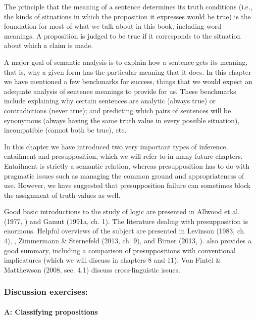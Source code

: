 The principle that the meaning of a sentence determines its truth conditions (i.e., the kinds of situations in which the proposition it expresses would be true) is the foundation for most of what we talk about in this book, including word meanings. A proposition is judged to be true if it corresponds to the situation about which a claim is made.



A major goal of semantic analysis is to explain how a sentence gets its meaning, that is, why a given form has the particular meaning that it does. In this chapter we have mentioned a few benchmarks for success, things that we would expect an adequate analysis of sentence meanings to provide for us. These benchmarks include explaining why certain sentences are analytic (always true) or contradictions (never true); and predicting which pairs of sentences will be synonymous (always having the same truth value in every possible situation), incompatible (cannot both be true), etc.



In this chapter we have introduced two very important types of inference, entailment and presupposition, which we will refer to in many future chapters. Entailment is strictly a semantic relation, whereas presupposition has to do with pragmatic issues such as managing the common ground and appropriateness of use. However, we have suggested that presupposition failure can sometimes block the assignment of truth values as well.



\furtherreading



Good basic introductions to the study of logic are presented in Allwood et al. (1977, ) and Gamut (1991a, ch. 1). The literature dealing with presupposition is enormous. Helpful overviews of the subject are presented in Levinson (1983, ch. 4), \citet{GeurtsBeaver2011}, Zimmermann \& Sternefeld (2013, ch. 9), and Birner (2013, ). \citet{Potts2015} also provides a good summary, including a comparison of presuppositions with conventional implicatures (which we will discuss in chapters 8 and 11). Von Fintel \& Matthewson (2008, sec. 4.1) discuss cross-linguistic issues.


\subsubsection{Discussion exercises:}\label{sec:}
\paragraph{A: Classifying propositions}

